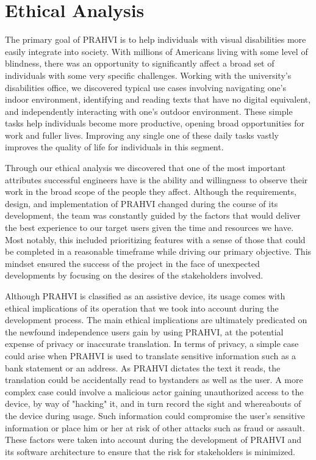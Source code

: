 \chapter{Ethical Analysis}
	The primary goal of PRAHVI is to help individuals with visual disabilities more easily integrate into society. With millions of Americans living with some level of blindness, there was an opportunity to significantly affect a broad set of individuals with some very specific challenges. Working with the university's disabilities office, we discovered typical use cases involving navigating one's indoor environment, identifying and reading texts that have no digital equivalent, and independently interacting with one's outdoor environment. These simple tasks help individuals become more productive, opening broad opportunities for work and fuller lives. Improving any single one of these daily tasks vastly improves the quality of life for individuals in this segment.
	
	Through our ethical analysis we discovered that one of the most important attributes successful engineers have is the ability and willingness to observe their work in the broad scope of the people they affect. Although the requirements, design, and implementation of PRAHVI changed during the course of its development, the team was constantly guided by the factors that would deliver the best experience to our target users given the time and resources we have. Most notably, this included prioritizing features with a sense of those that could be completed in a reasonable timeframe while driving our primary objective. This mindset ensured the success of the project in the face of unexpected developments by focusing on the desires of the stakeholders involved.
	
	Although PRAHVI is classified as an assistive device, its usage comes with ethical implications of its operation that we took into account during the development process. The main ethical implications are ultimately predicated on the newfound independence users gain by using PRAHVI, at the potential expense of privacy or inaccurate translation. In terms of privacy, a simple case could arise when PRAHVI is used to translate sensitive information such as a bank statement or an address. As PRAHVI dictates the text it reads, the translation could be accidentally read to bystanders as well as the user. A more complex case could involve a malicious actor gaining unauthorized access to the device, by way of "hacking" it, and in turn record the sight and whereabouts of the device during usage. Such information could compromise the user's sensitive information or place him or her at risk of other attacks such as fraud or assault. These factors were taken into account during the development of PRAHVI and its software architecture to ensure that the risk for stakeholders is minimized.

